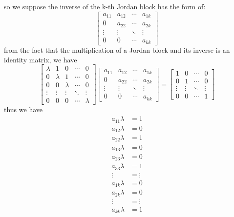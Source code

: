 \documentclass[12pt,a4paper]{article}
\begin{document}
so we suppose the inverse of the k-th Jordan block has the form of:
\[
    \begin{bmatrix}
        a_{11} & a_{12} & \cdots & a_{1k} \\
        0      & a_{22} & \cdots & a_{2k} \\
        \vdots & \vdots & \ddots & \vdots \\
        0      & 0      & \cdots & a_{kk}

    \end{bmatrix}
\]
from the fact that the multiplication of a Jordan block and its inverse is an identity matrix, we have
\[
    \begin{bmatrix}
        \lambda & 1      & 0      & \cdots & 0      \\
        0       & \lambda & 1      & \cdots & 0      \\
        0       & 0      & \lambda & \cdots & 0      \\
        \vdots  & \vdots & \vdots & \ddots & \vdots \\
        0       & 0      & 0      & \cdots & \lambda
    \end{bmatrix} \begin{bmatrix}
        a_{11} & a_{12} & \cdots & a_{1k} \\
        0      & a_{22} & \cdots & a_{2k} \\
        \vdots & \vdots & \ddots & \vdots \\
        0      & 0      & \cdots & a_{kk}
    \end{bmatrix} = \begin{bmatrix}
        1 & 0 & \cdots & 0 \\
        0 & 1 & \cdots & 0 \\
        \vdots & \vdots & \ddots & \vdots \\
        0 & 0 & \cdots & 1
    \end{bmatrix}
\]
thus we have
\[
    \begin{aligned}
        a_{11} \lambda & = 1 \\
        a_{12} \lambda & = 0 \\
        a_{22} \lambda & = 1 \\
        a_{13} \lambda & = 0 \\
        a_{23} \lambda & = 0 \\
        a_{33} \lambda & = 1 \\
        \vdots         & = \vdots \\
        a_{1k} \lambda & = 0 \\
        a_{2k} \lambda & = 0 \\
        \vdots         & = \vdots \\
        a_{kk} \lambda & = 1
    \end{aligned}
\]
\end{document}
